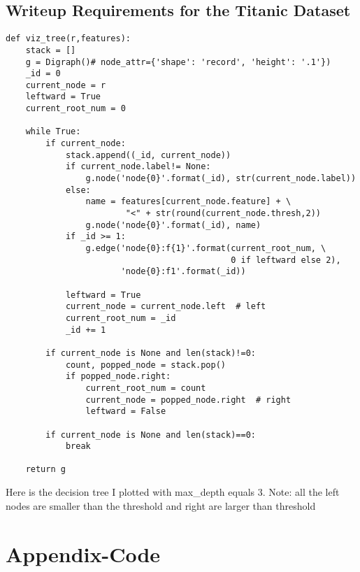 \documentclass[a4paper,12pt]{article}
\begin{document}
\clearpage
\subsection{Writeup Requirements for the Titanic Dataset}
\begin{lstlisting}
def viz_tree(r,features):
    stack = []
    g = Digraph()# node_attr={'shape': 'record', 'height': '.1'})
    _id = 0
    current_node = r
    leftward = True
    current_root_num = 0

    while True:
        if current_node:
            stack.append((_id, current_node))
            if current_node.label!= None:
                g.node('node{0}'.format(_id), str(current_node.label))
            else:
                name = features[current_node.feature] + \
                        "<" + str(round(current_node.thresh,2))
                g.node('node{0}'.format(_id), name)
            if _id >= 1:
                g.edge('node{0}:f{1}'.format(current_root_num, \
                                             0 if leftward else 2),
                       'node{0}:f1'.format(_id))

            leftward = True
            current_node = current_node.left  # left
            current_root_num = _id
            _id += 1

        if current_node is None and len(stack)!=0:
            count, popped_node = stack.pop()
            if popped_node.right:
                current_root_num = count
                current_node = popped_node.right  # right
                leftward = False

        if current_node is None and len(stack)==0:
            break      

    return g
\end{lstlisting}
Here is the decision tree I plotted with max\_depth equals 3. Note: all the left nodes are smaller than the threshold and right are larger than threshold
  \begin{center}
    \adjustimage{max size={1\linewidth}{1\paperheight}}{tree}
    \end{center}
    
\clearpage   
\section{Appendix-Code}
    
\end{document}
